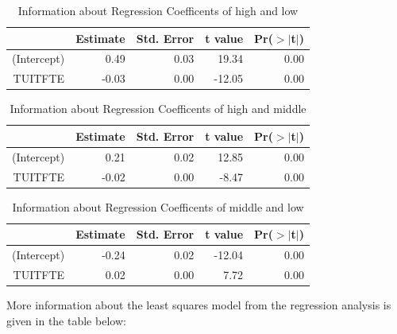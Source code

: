 \documentclass{article}
\begin{document}
\begin{table}[ht]
\centering
\caption{Information about Regression Coefficents of high and low} 
\begin{tabular}{rrrrr}
  \hline
 & Estimate & Std. Error & t value & Pr($>$$|$t$|$) \\ 
  \hline
(Intercept) & 0.49 & 0.03 & 19.34 & 0.00 \\ 
  TUITFTE & -0.03 & 0.00 & -12.05 & 0.00 \\ 
   \hline
\end{tabular}
\end{table}
\begin{table}[ht]
\centering
\caption{Information about Regression Coefficents of high and middle} 
\begin{tabular}{rrrrr}
  \hline
 & Estimate & Std. Error & t value & Pr($>$$|$t$|$) \\ 
  \hline
(Intercept) & 0.21 & 0.02 & 12.85 & 0.00 \\ 
  TUITFTE & -0.02 & 0.00 & -8.47 & 0.00 \\ 
   \hline
\end{tabular}
\end{table}
\begin{table}[ht]
\centering
\caption{Information about Regression Coefficents of middle and low} 
\begin{tabular}{rrrrr}
  \hline
 & Estimate & Std. Error & t value & Pr($>$$|$t$|$) \\ 
  \hline
(Intercept) & -0.24 & 0.02 & -12.04 & 0.00 \\ 
  TUITFTE & 0.02 & 0.00 & 7.72 & 0.00 \\ 
   \hline
\end{tabular}
\end{table}
More information about the least squares model from the regression analysis is given in the table below:
\end{document}
